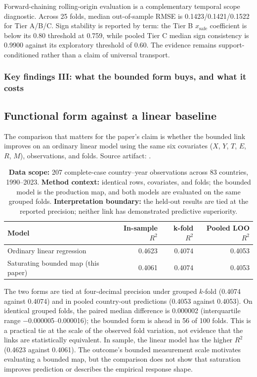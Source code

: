 \documentclass[11pt]{article}
\newcommand{\TableStyle}{%
    \small
    \setlength{\tabcolsep}{2pt}%
    \renewcommand{\arraystretch}{0.9}%
}
\begin{document}
Forward-chaining rolling-origin evaluation is a complementary temporal scope diagnostic. Across 25 folds, median out-of-sample RMSE is \num{0.1423}/\num{0.1421}/\num{0.1522} for Tier A/B/C. Sign stability is reported by term: the Tier B $x_{\text{safe}}$ coefficient is below its 0.80 threshold at \num{0.759}, while pooled Tier C median sign consistency is \num{0.9900} against its exploratory threshold of \num{0.60}. The evidence remains support-conditioned rather than a claim of universal transport.

\subsubsection*{Key findings III: what the bounded form buys, and what it costs}\label{sec:functional-form}

\subsection*{Functional form against a linear baseline}
The comparison that matters for the paper's claim is whether the bounded link improves on an ordinary linear model using the same six covariates ($X$, $Y$, $T$, $E$, $R$, $M$), observations, and folds. Source artifact: .

\begin{table}[!htbp]
\centering
\TableStyle
\caption{\textbf{Data scope:} 207 complete-case country--year observations across 83 countries, 1990--2023. \textbf{Method context:} identical rows, covariates, and folds; the bounded model is the production map, and both models are evaluated on the same grouped folds. \textbf{Interpretation boundary:} the held-out results are tied at the reported precision; neither link has demonstrated predictive superiority.}
\label{tab:functional-form}
\begin{tabularx}{\linewidth}{@{}lrrr@{}}
\toprule
Model & In-sample $R^2$ & k-fold $R^2$ & Pooled LOO $R^2$ \\
\midrule
Ordinary linear regression          & \num{0.4623} & \num{0.4074} & \num{0.4053} \\
Saturating bounded map (this paper) & \num{0.4061} & \num{0.4074} & \num{0.4053} \\
\bottomrule
\end{tabularx}
\end{table}

The two forms are tied at four-decimal precision under grouped $k$-fold (\num{0.4074} against \num{0.4074}) and in pooled country-out predictions (\num{0.4053} against \num{0.4053}). On identical grouped folds, the paired median difference is \num{0.000002} (interquartile range \num{-0.000005}--\num{0.000016}); the bounded form is ahead in 56 of 100 folds. This is a practical tie at the scale of the observed fold variation, not evidence that the links are statistically equivalent. In sample, the linear model has the higher $R^2$ (\num{0.4623} against \num{0.4061}). The outcome's bounded measurement scale motivates evaluating a bounded map, but the comparison does not show that saturation improves prediction or describes the empirical response shape.
\end{document}
